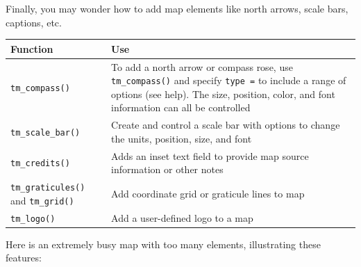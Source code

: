 \documentclass[
]{book}
\begin{document}
Finally, you may wonder how to add map elements like north arrows, scale bars, captions, etc.

\begin{longtable}[]{@{}
  >{\raggedright\arraybackslash}p{}
  >{\raggedright\arraybackslash}p{}@{}}
\toprule
Function & Use \\
\midrule
\endhead
\texttt{tm\_compass()} & To add a north arrow or compass rose, use \texttt{tm\_compass()} and specify \texttt{type\ =} to include a range of options (see help). The size, position, color, and font information can all be controlled \\
\texttt{tm\_scale\_bar()} & Create and control a scale bar with options to change the units, position, size, and font \\
\texttt{tm\_credits()} & Adds an inset text field to provide map source information or other notes \\
\texttt{tm\_graticules()} and \texttt{tm\_grid()} & Add coordinate grid or graticule lines to map \\
\texttt{tm\_logo()} & Add a user-defined logo to a map \\
\bottomrule
\end{longtable}

Here is an extremely busy map with too many elements, illustrating these features:
\end{document}
